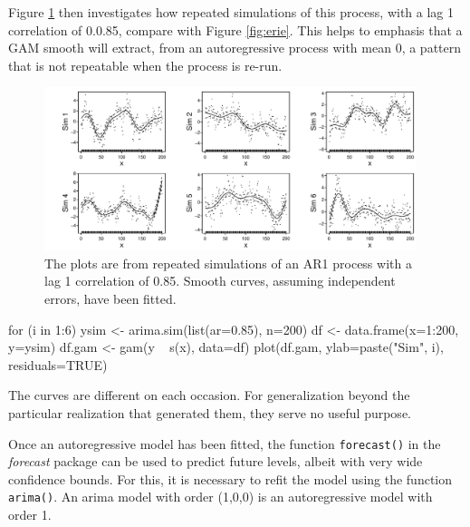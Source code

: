 \documentclass{tufte-book}\usepackage[]{graphicx}\usepackage[]{color}
\newcommand{\txtt}[1]{\texttt{#1}}
\begin{document}
Figure \ref{fig:ar1fits} then investigates how repeated simulations of
this process, with a lag 1 correlation of 0.0.85, compare with Figure
\ref{fig:erie}.  This helps to emphasis that a GAM smooth will
extract, from an autoregressive process with mean 0, a pattern that is
not repeatable when the process is re-run.

\begin{figure}
\begin{Schunk}


\centerline{\includegraphics[width=0.97\textwidth]{figs/12-arima-sim-1} }

\end{Schunk}
\caption{The plots are from repeated simulations of an AR1 process with a
  lag 1 correlation of 0.85.  Smooth curves, assuming independent
  errors, have been fitted.}\label{fig:ar1fits}
\end{figure}

\begin{marginfigure}[18pt]
\begin{Schunk}
\begin{Sinput}
for (i in 1:6){
ysim <-
  arima.sim(list(ar=0.85),
            n=200)
df <- data.frame(x=1:200,
                 y=ysim)
df.gam <- gam(y ~ s(x),
              data=df)
plot(df.gam,
     ylab=paste("Sim", i),
     residuals=TRUE)
}
\end{Sinput}
\end{Schunk}
\end{marginfigure}

The curves are different on each occasion.  For generalization beyond
the particular realization that generated them, they serve no useful
purpose.

Once an autoregressive model has been fitted, the function
\txtt{forecast()} in the \textit{forecast} package can be used to
predict future levels, albeit with very wide confidence bounds.
For this, it is necessary to refit the model using the function
\txtt{arima()}. An arima model with order (1,0,0) is an autoregressive
model with order 1.
\vspace*{10pt}
\end{document}
